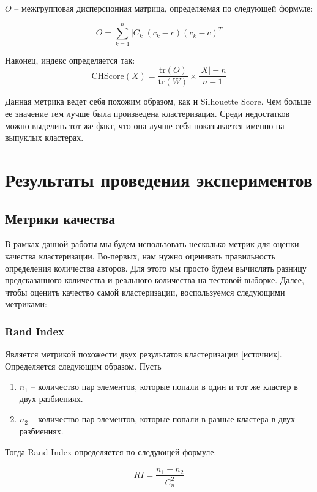 \bigskip
\noindent
$O$ -- межгрупповая дисперсионная матрица, определяемая по следующей формуле:

$$
O = \sum_{k = 1}^n |C_k|(c_k - c)(c_k - c)^T
$$

\smallskip
\noindent

Наконец, индекс определяется так:
$$
\text{CHScore}(X) = \frac{\text{tr}(O)}{\text{tr}(W)} \times \frac{|X| - n}{n - 1}
$$

Данная метрика ведет себя похожим образом, как и Silhouette Score. Чем больше ее значение тем лучше была произведена кластеризация. Среди недостатков можно выделить тот же факт, что она лучше себя показывается именно на выпуклых кластерах.

\newpage
\section{Результаты проведения экспериментов}

\subsection{Метрики качества}

В рамках данной работы мы будем использовать несколько метрик для оценки качества кластеризации. Во-первых, нам нужно оценивать правильность определения количества авторов. Для этого мы просто будем вычислять разницу предсказанного количества и реального количества на тестовой выборке. Далее, чтобы оценить качество самой кластеризации, воспользуемся следующими метриками:

\subsubsection{Rand Index}

Является метрикой похожести двух результатов кластеризации [источник]. Определяется следующим образом. Пусть

\begin{enumerate}
    \item $n_1$ -- количество пар элементов, которые попали в один и тот же кластер в двух разбиениях.
    \item $n_2$ --  количество пар элементов, которые попали в разные кластера в двух разбиениях.
\end{enumerate}

Тогда Rand Index определяется по следующей формуле:

$$
RI = \frac{n_1 + n_2}{C_n^2}
$$

